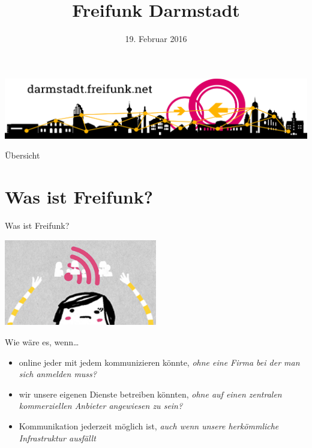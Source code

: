 \documentclass[10pt]{beamer}
\title{Freifunk Darmstadt}
\author{}
\institute[Inst.]{eine Initiative des Chaos Darmstadt e.V.}
\date{\footnotesize 19. Februar 2016}
\begin{document}

  \begin{frame}
    \centering\includegraphics[width=\textwidth]{images/logo-skyline}
    \maketitle
  \end{frame}

  \begin{frame}{Übersicht}
    \tableofcontents
  \end{frame}

  \section{Was ist Freifunk?}
    \begin{frame}{Was ist Freifunk?}
      \begin{center}
        \includegraphics[width=0.5\textwidth]{images/up}
      \end{center}
      Wie wäre es, wenn\ldots
      \begin{itemize}
        \pause
        \item online jeder mit jedem kommunizieren könnte\pause, \textit{ohne eine Firma bei der man sich anmelden muss?}
        \pause
        \item wir unsere eigenen Dienste betreiben könnten\pause,  \textit{ohne auf einen zentralen kommerziellen Anbieter angewiesen zu sein?}
        \pause
        \item Kommunikation jederzeit möglich ist\pause, \textit{auch wenn unsere herkömmliche Infrastruktur ausfällt}
      \end{itemize}
    \end{frame}
\end{document}

